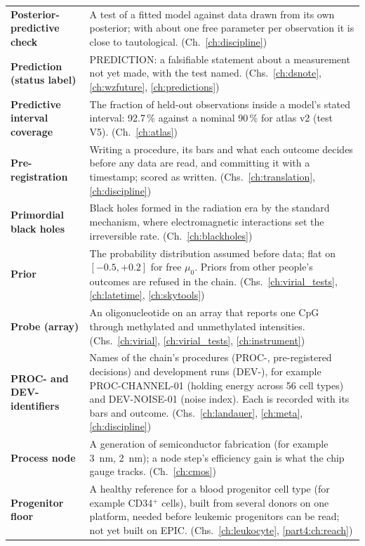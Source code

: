 {\begin{longtable}{@{}>{\raggedright\arraybackslash}p{}>{\raggedright\arraybackslash}p{}@{}}
\textbf{Posterior-predictive check} & A test of a fitted model against data drawn from its own posterior; with about one free parameter per observation it is close to tautological. {\footnotesize(Ch.~\ref{ch:discipline})}\\[1pt]
\textbf{Prediction (status label)} & PREDICTION: a falsifiable statement about a measurement not yet made, with the test named. {\footnotesize(Chs.~\ref{ch:dsnote}, \ref{ch:wzfuture}, \ref{ch:predictions})}\\[1pt]
\textbf{Predictive interval coverage} & The fraction of held-out observations inside a model's stated interval: 92.7\,\% against a nominal 90\,\% for atlas v2 (test V5). {\footnotesize(Ch.~\ref{ch:atlas})}\\[1pt]
\textbf{Pre-registration} & Writing a procedure, its bars and what each outcome decides before any data are read, and committing it with a timestamp; scored as written. {\footnotesize(Chs.~\ref{ch:translation}, \ref{ch:discipline})}\\[1pt]
\textbf{Primordial black holes} & Black holes formed in the radiation era by the standard mechanism, where electromagnetic interactions set the irreversible rate. {\footnotesize(Ch.~\ref{ch:blackholes})}\\[1pt]
\textbf{Prior} & The probability distribution assumed before data; flat on $[-0.5,+0.2]$ for free $\mu_0$. Priors from other people's outcomes are refused in the chain. {\footnotesize(Chs.~\ref{ch:virial_tests}, \ref{ch:latetime}, \ref{ch:skytools})}\\[1pt]
\textbf{Probe (array)} & An oligonucleotide on an array that reports one CpG through methylated and unmethylated intensities. {\footnotesize(Chs.~\ref{ch:virial}, \ref{ch:virial_tests}, \ref{ch:instrument})}\\[1pt]
\textbf{PROC- and DEV- identifiers} & Names of the chain's procedures (PROC-, pre-registered decisions) and development runs (DEV-), for example PROC-CHANNEL-01 (holding energy across 56 cell types) and DEV-NOISE-01 (noise index). Each is recorded with its bars and outcome. {\footnotesize(Chs.~\ref{ch:landauer}, \ref{ch:meta}, \ref{ch:discipline})}\\[1pt]
\textbf{Process node} & A generation of semiconductor fabrication (for example 3~nm, 2~nm); a node step's efficiency gain is what the chip gauge tracks. {\footnotesize(Ch.~\ref{ch:cmos})}\\[1pt]
\textbf{Progenitor floor} & A healthy reference for a blood progenitor cell type (for example CD34$^+$ cells), built from several donors on one platform, needed before leukemic progenitors can be read; not yet built on EPIC. {\footnotesize(Chs.~\ref{ch:leukocyte}, \ref{part4:ch:reach})}\\[1pt]

\end{longtable}}
